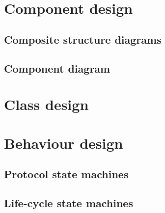 \section{Component design}


\subsection{Composite structure diagrams}


\subsection{Component diagram}





\section{Class design}



\section{Behaviour design}
\subsection{Protocol state machines}
%

\subsection{Life-cycle state machines}
%